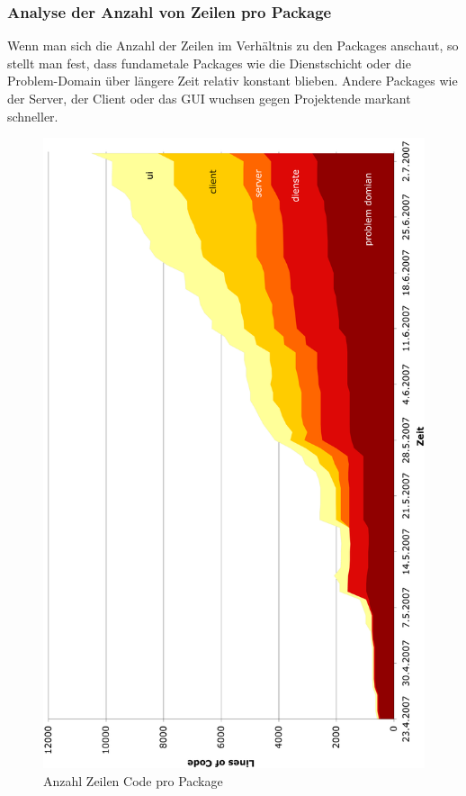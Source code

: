 \documentclass[12pt,halfparskip]{scrartcl}
\begin{document}
\subsubsection{Analyse der Anzahl von Zeilen pro Package}
Wenn man sich die Anzahl der Zeilen im Verhältnis zu den Packages anschaut, so stellt man fest, dass fundametale Packages wie die Dienstschicht oder die Problem-Domain über längere Zeit relativ konstant blieben. Andere Packages wie der Server, der Client oder das GUI wuchsen gegen Projektende markant schneller.
\begin{figure}[h]
	\centering
	\includegraphics[width=0.8 \textwidth]{anzahl_zeilen_pro_package}
	\caption{Anzahl Zeilen Code pro Package}
	\label{fig:anzahl_zeilen_pro_package}
\end{figure}
\end{document}
